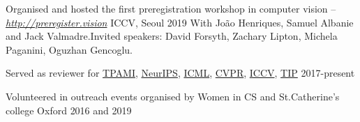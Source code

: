 \begin{cvreferee}
  \cvtalk
    {} %
    {Organised and hosted the first preregistration workshop in computer vision -- \textit{\href{http://preregister.vision}{http://preregister.vision}}} %
    {ICCV, Seoul} %
    {2019} %
  \cvtalkinfo
	{\textnormal{\scriptsize{\quad With Jo\~{a}o Henriques, Samuel Albanie and Jack Valmadre.\newline \quad Invited speakers: David Forsyth, Zachary Lipton, Michela Paganini, Oguzhan Gencoglu.}}} %
    {} %
    {}
	

   \cvtalk
    {} %
    {Served as reviewer for \href{https://www.computer.org/web/tpami}{TPAMI}, \href{http://nips.cc}{NeurIPS}, \href{http://icml.cc}{ICML}, \href{http://cvpr2018.thecvf.com}{CVPR}, \href{http://iccv2017.thecvf.com}{ICCV}, \href{http://ieeexplore.ieee.org/xpl/RecentIssue.jsp?punumber=83}{TIP}} %
    {} %
    {2017-present} %

   \cvtalk
    {} %
    {Volunteered in outreach events organised by Women in CS and St.Catherine's college} %
    {Oxford} %
    {2016 and 2019} %



\end{cvreferee}

